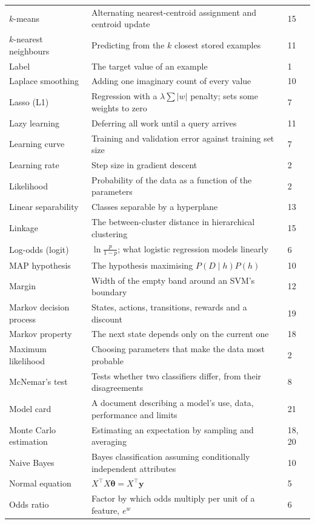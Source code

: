 \begin{longtable}{@{}L{3.9cm}L{9.9cm}L{1.1cm}@{}}
$k$-means & Alternating nearest-centroid assignment and centroid update & 15 \\
$k$-nearest neighbours & Predicting from the $k$ closest stored examples & 11 \\
Label & The target value of an example & 1 \\
Laplace smoothing & Adding one imaginary count of every value & 10 \\
Lasso (L1) & Regression with a $\lambda\sum|w|$ penalty; sets some weights to zero & 7 \\
Lazy learning & Deferring all work until a query arrives & 11 \\
Learning curve & Training and validation error against training set size & 7 \\
Learning rate & Step size in gradient descent & 2 \\
Likelihood & Probability of the data as a function of the parameters & 2 \\
Linear separability & Classes separable by a hyperplane & 13 \\
Linkage & The between-cluster distance in hierarchical clustering & 15 \\
Log-odds (logit) & $\ln\frac{p}{1-p}$; what logistic regression models linearly & 6 \\
MAP hypothesis & The hypothesis maximising $P(D \mid h)P(h)$ & 10 \\
Margin & Width of the empty band around an SVM's boundary & 12 \\
Markov decision process & States, actions, transitions, rewards and a discount & 19 \\
Markov property & The next state depends only on the current one & 18 \\
Maximum likelihood & Choosing parameters that make the data most probable & 2 \\
McNemar's test & Tests whether two classifiers differ, from their disagreements & 8 \\
Model card & A document describing a model's use, data, performance and limits & 21 \\
Monte Carlo estimation & Estimating an expectation by sampling and averaging & 18, 20 \\
Naive Bayes & Bayes classification assuming conditionally independent attributes & 10 \\
Normal equation & $X^{\top}X\boldsymbol{\theta} = X^{\top}\mathbf{y}$ & 5 \\
Odds ratio & Factor by which odds multiply per unit of a feature, $e^{w}$ & 6 \\

\end{longtable}
